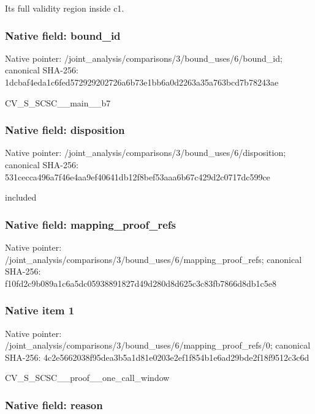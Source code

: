 \documentclass[10pt,a4paper]{article}
\begin{document}
Its full validity region inside c1.


\subsubsection{Native field: bound\_id}


Native pointer: /joint\_analysis/comparis\allowbreak{}ons/3/bound\_uses/6/bound\allowbreak{}\_id; canonical SHA-256: 1dcbaf4eda1c6fed57292920\allowbreak{}2726a6b73e1bb6a0d2263a35\allowbreak{}a763bcd7b78243ae


CV\_S\_SCSC\_\_main\_\_b7


\subsubsection{Native field: disposition}


Native pointer: /joint\_analysis/comparis\allowbreak{}ons/3/bound\_uses/6/dispo\allowbreak{}sition; canonical SHA-256: 531cecca496a7f46e4aa9ef4\allowbreak{}0641db12f8bef53aaa6b67c4\allowbreak{}29d2c0717dc599ce


included


\subsubsection{Native field: mapping\_proof\_refs}


Native pointer: /joint\_analysis/comparis\allowbreak{}ons/3/bound\_uses/6/mappi\allowbreak{}ng\_proof\_refs; canonical SHA-256: f10fd2c9b089a1c6a5dc0593\allowbreak{}8891827d49d280d8d625c3c8\allowbreak{}3fb7866d8db1c5e8



\subsubsection{Native item 1}


Native pointer: /joint\_analysis/comparis\allowbreak{}ons/3/bound\_uses/6/mappi\allowbreak{}ng\_proof\_refs/0; canonical SHA-256: 4c2e5662038f95dea3b5a1d8\allowbreak{}1e0203e2ef1f854b1e6ad29b\allowbreak{}de2f18f9512c3c6d


CV\_S\_SCSC\_\_proof\_\_one\_call\_window


\subsubsection{Native field: reason}
\end{document}
